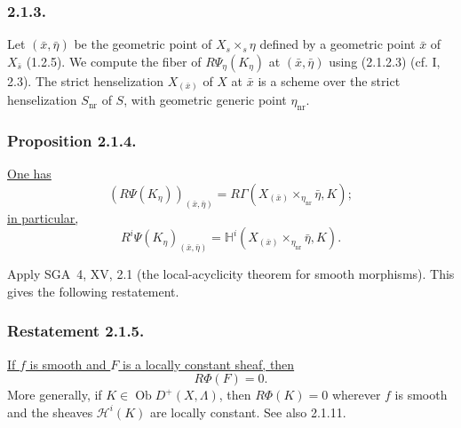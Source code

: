 \subsubsection*{2.1.3.}
Let $(\bar x,\bar\eta)$ be the geometric point of
$X_s\times_s\eta$ defined by a geometric point $\bar x$ of
$X_{\bar s}$ (1.2.5).  We compute the fiber of
$R\Psi_\eta(K_\eta)$ at $(\bar x,\bar\eta)$ using (2.1.2.3)
(cf. I, 2.3).  The strict henselization $X_{(\bar x)}$ of $X$ at
$\bar x$ is a scheme over the strict henselization $S_{\mathrm{nr}}$
of $S$, with geometric generic point $\eta_{\mathrm{nr}}$.

\subsubsection*{Proposition 2.1.4.}
\underline{One has}
\begin{equation*}
(R\Psi(K_\eta))_{(\bar x,\bar\eta)}
=R\Gamma\!\left(
X_{(\bar x)}\times_{\eta_{\mathrm{nr}}}\bar\eta,K
\right);
\end{equation*}
\underline{in particular,}
\begin{equation*}
R^i\Psi(K_\eta)_{(\bar x,\bar\eta)}
=\mathbb H^i\!\left(
X_{(\bar x)}\times_{\eta_{\mathrm{nr}}}\bar\eta,K
\right).
\end{equation*}

Apply SGA~4, XV, 2.1 (the local-acyclicity theorem for smooth
morphisms).  This gives the following restatement.

\subsubsection*{Restatement 2.1.5.}
\underline{If $f$ is smooth and $F$ is a locally constant sheaf, then}
\begin{equation*}
R\Phi(F)=0.
\end{equation*}
More generally, if $K\in\operatorname{Ob}D^+(X,\Lambda)$, then
$R\Phi(K)=0$ wherever $f$ is smooth and the sheaves
$\mathcal H^i(K)$ are locally constant.  See also 2.1.11.

